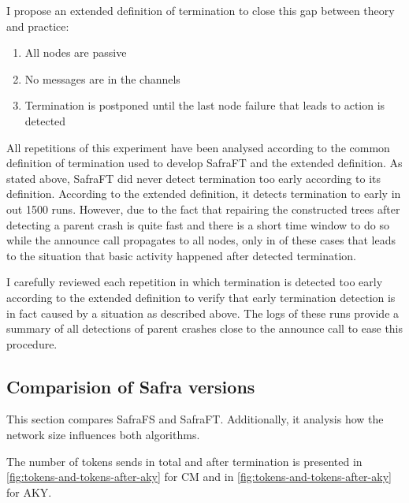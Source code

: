 I propose an extended definition of termination to close this gap between theory and practice:
\begin{enumerate}
	\item All nodes are passive
	\item No messages are in the channels
	\item Termination is postponed until the last node failure that leads to action is detected
\end{enumerate}
\label{extended-definition}
All repetitions of this experiment have been analysed according to the common definition of termination used to develop SafraFT and the extended definition.
As stated above, SafraFT did never detect termination too early according to its definition.
According to the extended definition, it detects termination to early in  out 1500 runs.  %
However, due to the fact that repairing the constructed trees after detecting a parent crash is quite fast and there is a short time window to do so while the announce call propagates to all nodes, only in  of these cases that leads to the situation that basic activity happened after detected termination. %


I carefully reviewed each repetition in which termination is detected too early according to the extended definition to verify that early termination detection is in fact caused by a situation as described above.
The logs of these runs provide a summary of all detections of parent crashes close to the announce call to ease this procedure.

\subsection{Comparision of Safra versions}
This section compares SafraFS and SafraFT.
Additionally, it analysis how the network size influences both algorithms.

The number of tokens sends in total and after termination is presented in \cref{fig:tokens-and-tokens-after-aky} for CM and in \cref{fig:tokens-and-tokens-after-aky} for AKY.

